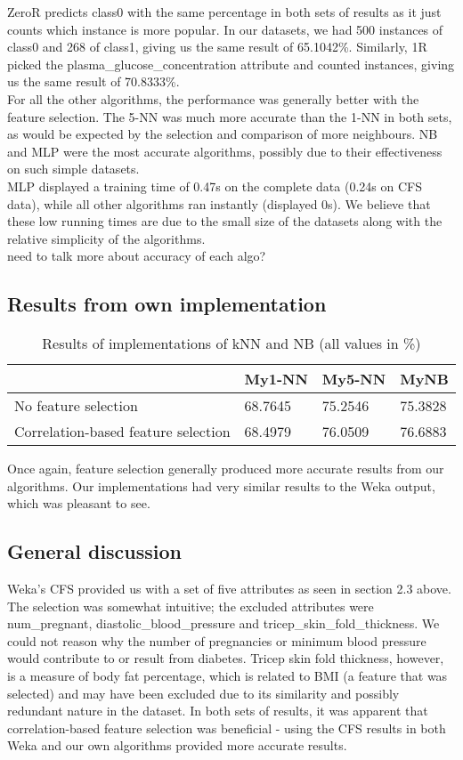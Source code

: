 \documentclass{article}
\begin{document}
ZeroR predicts class0 with the same percentage in both sets of results as it just counts which instance is more popular. In our datasets, we had 500 instances of class0 and 268 of class1, giving us the same result of 65.1042\%. Similarly, 1R picked the plasma\_glucose\_concentration attribute and counted instances, giving us the same result of 70.8333\%. \\
For all the other algorithms, the performance was generally better with the feature selection. The 5-NN was much more accurate than the 1-NN in both sets, as would be expected by the selection and comparison of more neighbours. NB and MLP were the most accurate algorithms, possibly due to their effectiveness on such simple datasets.  \\
MLP displayed a training time of 0.47s on the complete data (0.24s on CFS data), while all other algorithms ran instantly (displayed 0s). We believe that these low running times are due to the small size of the datasets along with the relative simplicity of the algorithms.  \\

need to talk more about accuracy of each algo? 

\subsection{Results from own implementation}
\begin{table}[h]
\centering
\begin{tabular}{@{}llll@{}}
\hline
 									& My1-NN & My5-NN & MyNB \\ \hline
No feature selection 					& 68.7645 & 75.2546 & 75.3828 \\
Correlation-based feature selection 	& 68.4979 & 76.0509 & 76.6883 \\ \hline
\end{tabular}
\caption {Results of implementations of kNN and NB (all values in \%)}
\end{table}

Once again, feature selection generally produced more accurate results from our algorithms. Our implementations had very similar results to the Weka output, which was pleasant to see. 

\subsection{General discussion}
Weka's CFS provided us with a set of five attributes as seen in section 2.3 above. The selection was somewhat intuitive; the excluded attributes were num\_pregnant, diastolic\_blood\_pressure and tricep\_skin\_fold\_thickness. We could not reason why the number of pregnancies or minimum blood pressure would contribute to or result from diabetes. Tricep skin fold thickness, however, is a measure of body fat percentage, which is related to BMI (a feature that was selected) and may have been excluded due to its similarity and possibly redundant nature in the dataset.
In both sets of results, it was apparent that correlation-based feature selection was beneficial - using the CFS results in both Weka and our own algorithms provided more accurate results.  \\
\end{document}

